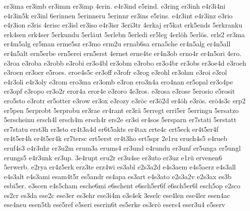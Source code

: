 {    er3ima
    er3imb
    er3imm
    er3imp
    4erin.
    e4r3ind
    e5rind.
    e3ring
    er3inh
    e4r3i4ni
    e4r3in5k
    er3inl
    6erinnen
    5erinneru
    5erinnr
    er3ins
    e5rins.
    e4r3int
    e4r3inz
    e3rio
    e4r3ion
    e3ris
    4erisc
    er3isl
    er3iso
    e4r3isr
    3eri3tr
    4erkaj
    er5kat
    erk5ends
    5erkranku
    erk4sen
    erk4ser
    5erkundu
    5erläut
    5erlebn
    5erledi
    er5leg
    4erlöh
    5erlös.
    erls2
    er3ma
    er4m5alg
    er5man
    erme5sz
    er3mo
    erm2u
    ernab6sa
    erna5che
    er4n5alg
    er4n5all
    er4n5alt
    ern5erbe
    ern5erei
    ern5erst
    4ernet
    erne4te
    er4n3ob
    erno4r
    er4n5ori
    4ero.
    e3roa
    e3roba
    e3robb
    e3robi
    er3o4bl
    er3obm
    e3robo
    er3o4br
    er3obs
    er3oe4d
    e3roeh
    e3roen
    er3oer
    e5roes.
    eroe4s5c
    er3off
    e3rofr
    e3rog
    e3rohl
    er3ohm
    e3roi
    e3rol
    e4r3oli
    e4r3oly
    e3rom
    ero3ma
    er3omb
    e3ron
    ero3n4a
    ero4nan
    er5opal
    er3o4pe
    er3opf
    e3ropo
    er3o2r
    eror4a
    eror4e
    e3roro
    4e3ros.
    e3rosa
    e3rose
    5erosio
    e5rosit
    ero5sto
    e3rotr
    er5otter
    e3row
    er3ox
    e3rozy
    e3röc
    er3ö2d
    er4öh
    e3rös.
    erö4s3c
    erp2
    er5pen
    5erprobt
    5erprobu
    er3rae
    er4rant
    er3rä
    5erregt
    erri5er
    5erringu
    5ersatzo
    5erscheinu
    ersch4l
    ersch4m
    ersch4r
    ers2e
    er3si
    er4sos
    5ersparn
    er7stati
    5erstatt
    er7statu
    erst3h
    er3sto
    er4t3a4d
    er6t5akts
    er4tax
    erte4c
    ert5eck
    er4t5er4f
    er4t5er4h
    er4t5er4k
    er7tersc
    ert5erst
    er4t3ho
    ert5spr
    2e1ru
    eruch4s5
    e4rueb
    eruf4s3
    e4r3uhr
    er3u2m
    erum3a
    erums4
    er3und
    e4rundu
    er3unf
    er5unga
    er5ungl
    erungs5
    e4r3unk
    er3up.
    3e4rupt
    eru2r
    er3u4se
    er3uto
    er3uz
    e1rü
    ervenen6
    5erwerb.
    e2rya
    er4z5erk
    erz3te
    erz4wi
    es3abl
    e2s3a2d
    e4s3aem
    e4s5aerz
    e4s3all
    e4s3alt
    e4s3ami
    esam4t5r
    es5andr
    es4apa
    es3art
    e4s3ato
    e2s3a2v
    e2s3ax
    es3b
    esbi5er.
    e3scen
    e4s5cham
    esche6mi
    e6schent
    e6sch5er6f
    e6sch5er6l
    esch5op
    e2sco
    es2cr
    es3da
    ese2c
    ese3er
    es3ehr
    ese3i4m
    e3s4ek
    3eselc
    ese4len
    ese4ler
    esen4ac
    ese4neu
    esen5th
    ese5ref
    e5seri
    eserin6t
    es5erke
    es3erö
    esers4
    eser3u4
    e5serv
}

